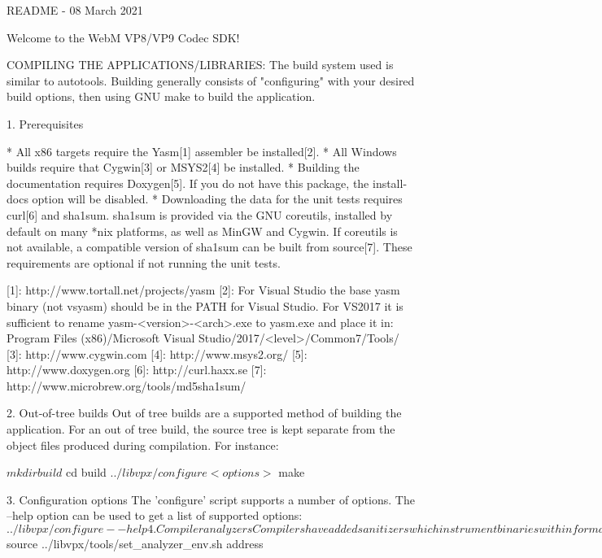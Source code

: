 
\begin{DoxyVerbInclude}
README - 08 March 2021

Welcome to the WebM VP8/VP9 Codec SDK!

COMPILING THE APPLICATIONS/LIBRARIES:
  The build system used is similar to autotools. Building generally consists of
  "configuring" with your desired build options, then using GNU make to build
  the application.

  1. Prerequisites

    * All x86 targets require the Yasm[1] assembler be installed[2].
    * All Windows builds require that Cygwin[3] or MSYS2[4] be installed.
    * Building the documentation requires Doxygen[5]. If you do not
      have this package, the install-docs option will be disabled.
    * Downloading the data for the unit tests requires curl[6] and sha1sum.
      sha1sum is provided via the GNU coreutils, installed by default on
      many *nix platforms, as well as MinGW and Cygwin. If coreutils is not
      available, a compatible version of sha1sum can be built from
      source[7]. These requirements are optional if not running the unit
      tests.

    [1]: http://www.tortall.net/projects/yasm
    [2]: For Visual Studio the base yasm binary (not vsyasm) should be in the
         PATH for Visual Studio. For VS2017 it is sufficient to rename
         yasm-<version>-<arch>.exe to yasm.exe and place it in:
         Program Files (x86)/Microsoft Visual Studio/2017/<level>/Common7/Tools/
    [3]: http://www.cygwin.com
    [4]: http://www.msys2.org/
    [5]: http://www.doxygen.org
    [6]: http://curl.haxx.se
    [7]: http://www.microbrew.org/tools/md5sha1sum/

  2. Out-of-tree builds
  Out of tree builds are a supported method of building the application. For
  an out of tree build, the source tree is kept separate from the object
  files produced during compilation. For instance:

    $ mkdir build
    $ cd build
    $ ../libvpx/configure <options>
    $ make

  3. Configuration options
  The 'configure' script supports a number of options. The --help option can be
  used to get a list of supported options:
    $ ../libvpx/configure --help

  4. Compiler analyzers
  Compilers have added sanitizers which instrument binaries with information
  about address calculation, memory usage, threading, undefined behavior, and
  other common errors. To simplify building libvpx with some of these features
  use tools/set_analyzer_env.sh before running configure. It will set the
  compiler and necessary flags for building as well as environment variables
  read by the analyzer when testing the binaries.
    $ source ../libvpx/tools/set_analyzer_env.sh address


\end{DoxyVerbInclude}
